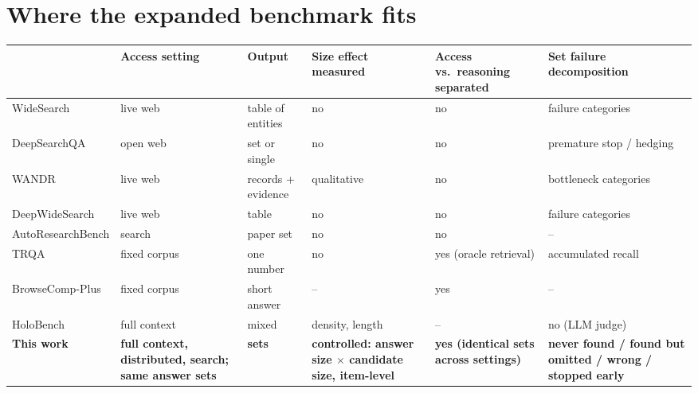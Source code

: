 \documentclass[10pt]{article}
\begin{document}
\section*{Where the expanded benchmark fits}
{\small\setlength{\tabcolsep}{3pt}
\begin{tabularx}{\linewidth}{@{}>{\raggedright\arraybackslash}p{2.75cm}>{\raggedright\arraybackslash}p{2.0cm}
>{\raggedright\arraybackslash}X>{\raggedright\arraybackslash}X>{\raggedright\arraybackslash}X
>{\raggedright\arraybackslash}X@{}}
\toprule
 & Access setting & Output & Size effect measured & Access vs.\ reasoning separated & Set failure decomposition \\
\midrule
WideSearch & live web & table of entities & no & no & failure categories \\
DeepSearchQA & open web & set or single & no & no & premature stop / hedging \\
WANDR & live web & records + evidence & qualitative & no & bottleneck categories \\
DeepWideSearch & live web & table & no & no & failure categories \\
AutoResearchBench & search & paper set & no & no & -- \\
TRQA & fixed corpus & one number & no & yes (oracle retrieval) & accumulated recall \\
BrowseComp-Plus & fixed corpus & short answer & -- & yes & -- \\
HoloBench & full context & mixed & density, length & -- & no (LLM judge) \\
\midrule
\textbf{This work} & \textbf{full context, distributed, search; same answer sets} & \textbf{sets} &
\textbf{controlled: answer size $\times$ candidate size, item-level} & \textbf{yes (identical sets across
settings)} & \textbf{never found / found but omitted / wrong / stopped early} \\
\bottomrule
\end{tabularx}}
\end{document}
